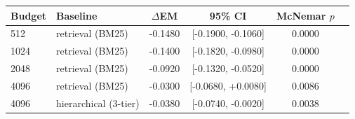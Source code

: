 \begin{tabular}{llcccc}
\toprule
Budget & Baseline & $\Delta$EM & 95\% CI & McNemar $p$ \\
\midrule
512 & retrieval (BM25) & -0.1480 & [-0.1900, -0.1060] & 0.0000 \\
1024 & retrieval (BM25) & -0.1400 & [-0.1820, -0.0980] & 0.0000 \\
2048 & retrieval (BM25) & -0.0920 & [-0.1320, -0.0520] & 0.0000 \\
4096 & retrieval (BM25) & -0.0300 & [-0.0680, +0.0080] & 0.0086 \\
4096 & hierarchical (3-tier) & -0.0380 & [-0.0740, -0.0020] & 0.0038 \\
\bottomrule
\end{tabular}